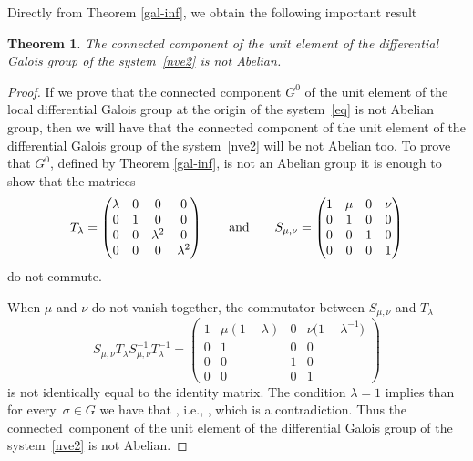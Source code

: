 \documentclass[10pt,a4paper]{amsart}
\numberwithin{equation}{section}
\newtheorem{Theorem}{Theorem}[section]
\begin{document}
 Directly from Theorem \ref{gal-inf}, we obtain the following important result


 \begin{Theorem}\label{g0}
 The connected component of the unit element of the differential Galois group of the system~\eqref{nve2}
 is not Abelian.
 \end{Theorem}



 \begin{proof}
 If we prove that the connected component $G^0$ of the unit element of the local differential Galois group at the origin of the system~\eqref{eq} is not Abelian
 group, then we will have that the connected component of the unit element of the differential Galois group of the system~\eqref{nve2} will be not Abelian too.
 To prove that $G^0$, defined by Theorem \ref{gal-inf}, is not an Abelian group it is enough to show that the matrices{\samepage
 \[
 T_{\lambda}=\begin{pmatrix}
 	\lambda & 0 & 0 & 0\\
 	0 & 1 & 0 & 0\\
 	0 & 0 & \lambda^2 & 0\\
 	0 & 0 & 0 & \lambda^2
 \end{pmatrix} \qquad {\rm and} \qquad
 S_{\mu, \nu}=\begin{pmatrix}
 	1 & \mu & 0 & \nu\\
 	0 & 1 & 0 & 0\\
 	0 & 0 & 1 & 0\\
 	0 & 0 & 0 & 1
 \end{pmatrix}
 \]
 do not commute.}

 When $\mu$ and $\nu$ do not vanish together, the commutator between $S_{\mu, \nu}$ and $T_{\lambda}$
 \[
 S_{\mu, \nu} T_{\lambda} S^{-1}_{\mu, \nu} T^{-1}_{\lambda}=
 \begin{pmatrix}
 1 & \mu (1-\lambda) & 0 & \nu \bigl(1- \lambda^{-1}\bigr)\\
 0 & 1 & 0 & 0\\
 0 & 0 & 1 & 0\\
 0 & 0 & 0 & 1
 \end{pmatrix}
 \]
 is not identically equal to the identity matrix. The condition $\lambda=1$ implies than for every~${\sigma\in G}$ we have that , i.e.,
 , which is a contradiction. Thus the connected~component of the unit element
 of the differential Galois group of the system~\eqref{nve2} is not Abelian.
 \end{proof}
\end{document}
